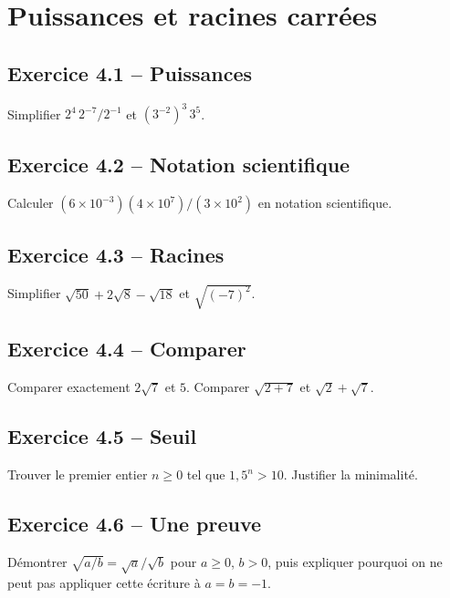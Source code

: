 \chapter{Puissances et racines carrées}
\section*{Exercice 4.1 -- Puissances}
Simplifier $2^4\,2^{-7}/2^{-1}$ et $(3^{-2})^3\,3^5$.

\section*{Exercice 4.2 -- Notation scientifique}
Calculer $(6\times10^{-3})(4\times10^7)/(3\times10^2)$ en notation scientifique.

\section*{Exercice 4.3 -- Racines}
Simplifier $\sqrt{50}+2\sqrt8-\sqrt{18}$ et $\sqrt{(-7)^2}$.

\section*{Exercice 4.4 -- Comparer}
Comparer exactement $2\sqrt7$ et $5$. Comparer $\sqrt{2+7}$ et $\sqrt2+\sqrt7$.

\section*{Exercice 4.5 -- Seuil}
Trouver le premier entier $n\geq0$ tel que $1{,}5^n>10$. Justifier la minimalité.

\section*{Exercice 4.6 -- Une preuve}
Démontrer $\sqrt{a/b}=\sqrt a/\sqrt b$ pour $a\geq0$, $b>0$, puis expliquer pourquoi on ne peut pas appliquer cette écriture à $a=b=-1$.
